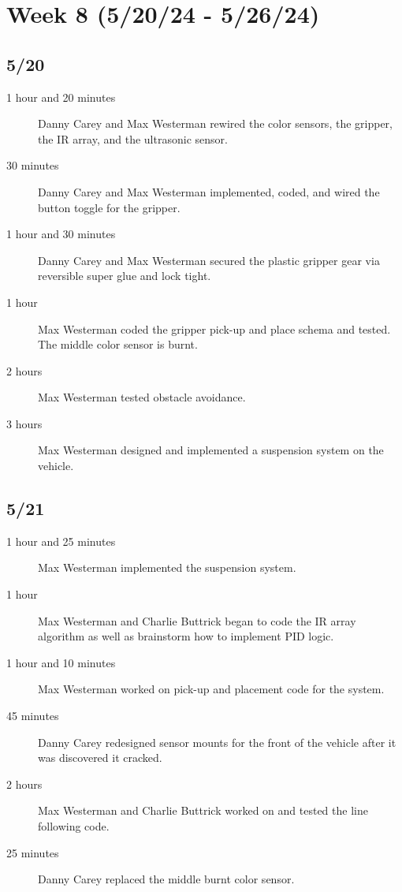 \documentclass[11pt]{report}
\begin{document}
\section{Week 8 (5/20/24 - 5/26/24)}
\begin{adjustwidth}{0.5cm}{0cm}
\subsection*{5/20}
\begin{greylineformat}
\begin{description}
    \item [1 hour and 20 minutes] Danny Carey and Max Westerman rewired the color sensors, the gripper, the \gls{IR} array, and the ultrasonic sensor. 
    \item [30 minutes] Danny Carey and Max Westerman implemented, coded, and wired the button toggle for the gripper. 
    \item [1 hour and 30 minutes] Danny Carey and Max Westerman secured the plastic gripper gear via reversible super glue and lock tight. 
    \item [1 hour] Max Westerman coded the gripper pick-up and place schema and tested. The middle color sensor is burnt.
    \item [2 hours] Max Westerman tested obstacle avoidance. 
    \item [3 hours] Max Westerman designed and implemented a suspension system on the vehicle. 
\end{description}\end{greylineformat}

\vspace{-2.1em}\subsection*{5/21}
\begin{greylineformat}
\begin{description}
    \item [1 hour and 25 minutes] Max Westerman implemented the suspension system. 
    \item [1 hour] Max Westerman and Charlie Buttrick began to code the \gls{IR} array algorithm as well as brainstorm how to implement \gls{PID} logic. 
    \item [1 hour and 10 minutes] Max Westerman worked on pick-up and placement code for the system. 
    \item [45 minutes] Danny Carey redesigned sensor mounts for the front of the vehicle after it was discovered it cracked. 
    \item [2 hours] Max Westerman and Charlie Buttrick worked on and tested the line following code. 
    \item [25 minutes] Danny Carey replaced the middle burnt color sensor. 
\end{description}\end{greylineformat}


\end{adjustwidth}
\end{document}
